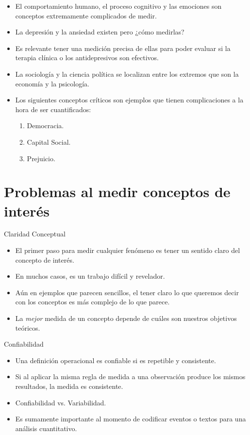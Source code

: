 \documentclass[xcolor=dvipsnames]{beamer}
\begin{document}
\begin{frame}
	\begin{itemize}
\justifying
\item El comportamiento humano, el proceso cognitivo y las emociones son conceptos extremamente complicados de medir.
\item La depresión y la ansiedad existen pero ¿cómo medirlas?
\item Es relevante tener una medición precisa de ellas para poder evaluar si la terapia clínica o los antidepresivos son efectivos.
\item La sociología y la ciencia política se localizan entre los extremos que son la economía y la psicología.
\item Los siguientes conceptos críticos son ejemplos que tienen complicaciones a la hora de ser cuantificados:
\begin{enumerate}
\item Democracia.
\item Capital Social.
\item Prejuicio.
\end{enumerate}
\end{itemize}

\end{frame}

\section{Problemas al medir conceptos de interés}
\begin{frame}{Claridad Conceptual}
	\begin{itemize}
		\justifying
		\item El primer paso para medir cualquier fenómeno es tener un sentido claro del concepto de interés.
		\item En muchos casos, es un trabajo difícil y revelador.
		\item Aún en ejemplos que parecen sencillos, el tener claro lo que queremos decir con los conceptos es más complejo de lo que parece.
\item La \emph{mejor} medida de un concepto depende de cuáles son nuestros objetivos teóricos.
	\end{itemize}
\end{frame}

\begin{frame}{Confiabilidad}
\begin{itemize}
\justifying
\item Una definición operacional es confiable si es repetible y consistente.
\item Si al aplicar la misma regla de medida a una observación produce los mismos resultados, la medida es consistente.
\item Confiabilidad vs. Variabilidad.
\item Es sumamente importante al momento de codificar eventos o textos para una análisis cuantitativo.
\end{itemize}
\end{frame}
\end{document}
